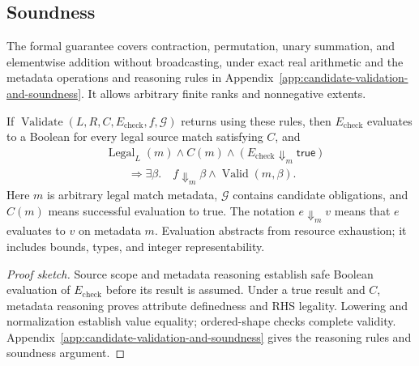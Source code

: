 \subsection{Soundness}
\label{sec:validation-soundness}
The formal guarantee covers contraction, permutation, unary summation,
and elementwise addition without broadcasting, under exact real arithmetic
and the metadata operations and reasoning rules in
Appendix~\ref{app:candidate-validation-and-soundness}. It allows arbitrary finite ranks and
nonnegative extents.
\begin{theorem}
\label{thm:validator-soundness}
If $\operatorname{Validate}(L,R,C,E_{\mathrm{check}},f,\mathcal G)$ returns 
using these rules, then $E_{\mathrm{check}}$ evaluates to a Boolean for every legal source
match satisfying $C$, and
\begin{equation}
\begin{aligned}
 &\operatorname{Legal}_L(m)\land C(m)
       \land(E_{\mathrm{check}}\Downarrow_m\mathsf{true})\\
 &\qquad\Longrightarrow\exists\beta.\quad f\Downarrow_m\beta
       \land\operatorname{Valid}(m,\beta).
\end{aligned}
 \label{eq:acceptance-soundness}
\end{equation}
Here $m$ is arbitrary legal match metadata, $\mathcal G$ contains candidate
obligations, and $C(m)$ means successful evaluation to true. The notation
$e\Downarrow_m v$ means that $e$ evaluates to $v$ on metadata $m$.
Evaluation abstracts from resource exhaustion; it includes bounds,
types, and integer representability.
\end{theorem}

\begin{proof}[Proof sketch]
Source scope and metadata reasoning establish safe Boolean evaluation of
$E_{\mathrm{check}}$ before its result is assumed. Under a true result and $C$, metadata
reasoning proves attribute definedness and RHS legality. Lowering and
normalization establish value equality; ordered-shape checks complete
validity.
Appendix~\ref{app:candidate-validation-and-soundness} gives the reasoning rules and
soundness argument.
\end{proof}

